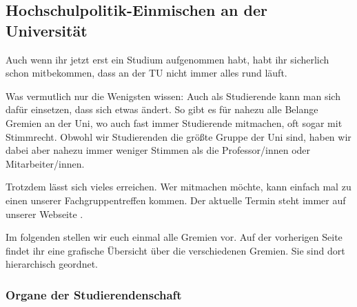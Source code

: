 \subsection{Hochschulpolitik-Einmischen an der Universität}

Auch wenn ihr jetzt erst ein Studium aufgenommen habt, habt ihr sicherlich 
schon mitbekommen, dass an der TU nicht immer alles rund läuft.

Was vermutlich nur die Wenigsten wissen: Auch als Studierende kann man sich 
dafür einsetzen, dass sich etwas ändert. So gibt es für nahezu alle Belange Gremien 
an der Uni, wo auch fast immer Studierende mitmachen, oft sogar mit Stimmrecht. 
Obwohl wir Studierenden die größte Gruppe der Uni sind, haben wir dabei aber nahezu immer 
weniger Stimmen als die Professor/innen oder Mitarbeiter/innen. 

Trotzdem lässt sich vieles erreichen. Wer mitmachen möchte, kann einfach 
mal zu einen unserer Fachgruppentreffen kommen. Der aktuelle Termin steht immer 
auf unserer Webseite .

Im folgenden stellen wir euch einmal alle Gremien vor.
Auf der vorherigen Seite findet ihr eine grafische Übersicht über die verschiedenen Gremien. Sie sind dort hierarchisch geordnet.

\subsubsection*{Organe der Studierendenschaft}

